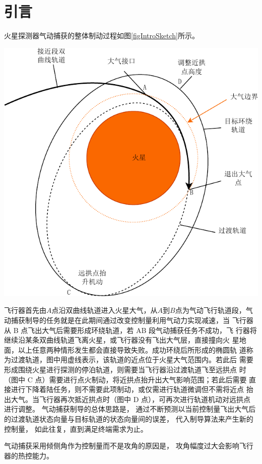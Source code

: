 \section{引\quad 言}
火星探测器气动捕获的整体制动过程如图\ref{figIntroSketch}所示。
\begin{center}
	\includegraphics[scale=0.8]{IntroSketch.pdf}  \\
	 \label{figIntroSketch}
\end{center}
飞行器首先由$A$点沿双曲线轨道进入火星大气，从$A$到$B$点为气动飞行轨道段，气动捕获制导的任务就是在此期间通过改变控制量利用气动力实现减速，当 飞行器从 B 点飞出大气后需要形成环绕轨道，若 AB 段气动捕获任务不成功，飞 行器将继续沿某条双曲线轨道飞离火星，或飞行器没有飞出大气层，直接撞向火 星地面，以上任意两种情形发生都会直接导致失败。成功环绕后所形成的椭圆轨 道称为过渡轨道，图中用虚线表示，该轨道的近点位于火星大气范围内。若此后 需要形成围绕火星进行探测的停泊轨道，则需要当飞行器沿过渡轨道飞至远拱点 时（图中 C 点）需要进行点火制动，将近拱点抬升出大气影响范围；若此后需要 直接进行下降着陆任务，则不需要此项制动，或仅需进行轨道微调但不需将近点 抬出大气。当飞行器再次抵近拱点时（图中 D 点），可再次进行轨道机动对远拱点 进行调整。
气动捕获制导的总体思路是，
通过不断预测以当前控制量飞出大气后的过渡轨道状态向量与目标轨道的状态向量间的误差，
代入制导算法来产生新的控制量，
如此往复，直到满足终端需求为止。

气动捕获采用倾侧角作为控制量而不是攻角的原因是，
攻角幅度过大会影响飞行器的热控能力。
